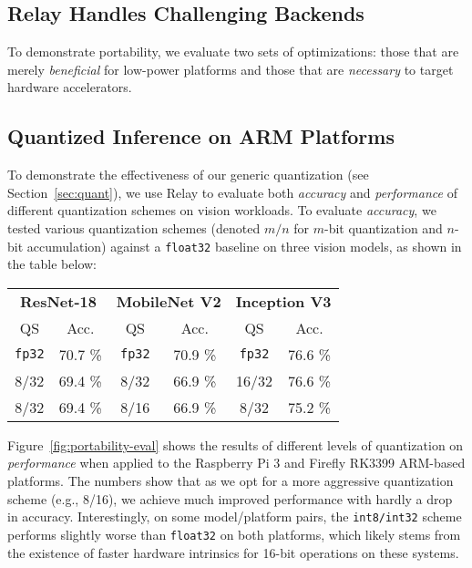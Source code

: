 \subsection{Relay Handles Challenging Backends}
\label{sec:low-power}
To demonstrate portability,
  we evaluate two sets of optimizations:
    those that are merely \textit{beneficial} for low-power platforms and
    those that are \textit{necessary} to target hardware accelerators.

\subsection*{Quantized Inference on ARM Platforms}
To demonstrate the effectiveness of our generic quantization (see Section~\ref{sec:quant}),
  we use Relay to evaluate both \textit{accuracy} and \textit{performance} of different
  quantization schemes on vision workloads.
To evaluate \textit{accuracy},
  we tested various quantization schemes
  (denoted $m/n$ for $m$-bit quantization and $n$-bit accumulation)
  against a \texttt{float32} baseline on three vision models,
  as shown in the table below:
\begin{center}
  \begin{tabular}{|c|c||c|c||c|c|}
    \hline
    \multicolumn{2}{|c}{\textbf{ResNet-18}} & \multicolumn{2}{c}{\textbf{MobileNet V2}} & \multicolumn{2}{c|}{\textbf{Inception V3}} \\
    \multicolumn{1}{|c}{QS}    & \multicolumn{1}{c}{Acc.}   &  \multicolumn{1}{c}{QS}  & \multicolumn{1}{c}{Acc.}  & \multicolumn{1}{c}{QS}  & \multicolumn{1}{c|}{Acc.} \\
    \hline
    \texttt{fp32} & 70.7 \%    & \texttt{fp32} & 70.9 \%       & \texttt{fp32} & 76.6 \% \\
    8/32         & 69.4 \%    & 8/32         & 66.9 \%       & 16/32        & 76.6 \% \\
    8/32         & 69.4 \%    & 8/16         & 66.9 \%       & 8/32         & 75.2 \% \\
    \hline
  \end{tabular}
\end{center}
Figure~\ref{fig:portability-eval} shows the results of different
  levels of quantization on \textit{performance} when applied to the Raspberry Pi 3
  and Firefly RK3399 ARM-based platforms.
The numbers show that as we opt for a more aggressive quantization scheme
  (e.g., 8/16),
  we achieve much improved performance with hardly a drop in accuracy.
Interestingly,
  on some model/platform pairs,
  the \texttt{int8/int32} scheme performs slightly worse than \texttt{float32} on both platforms,
  which likely stems from the existence of faster hardware intrinsics for 16-bit operations on these systems.

